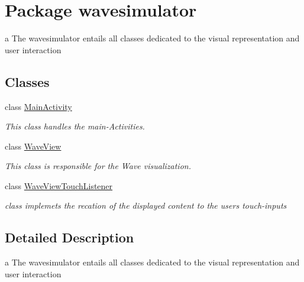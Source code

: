 \hypertarget{namespacewavesimulator}{}\section{Package wavesimulator}
\label{namespacewavesimulator}


a The wavesimulator entails all classes dedicated to the visual representation and user interaction  


\subsection*{Classes}
\begin{DoxyCompactItemize}
\item 
class \hyperlink{classwavesimulator_1_1MainActivity}{Main\+Activity}
\begin{DoxyCompactList}\small\item\em This class handles the main-\/\+Activities. \end{DoxyCompactList}\item 
class \hyperlink{classwavesimulator_1_1WaveView}{Wave\+View}
\begin{DoxyCompactList}\small\item\em This class is responsible for the Wave visualization. \end{DoxyCompactList}\item 
class \hyperlink{classwavesimulator_1_1WaveViewTouchListener}{Wave\+View\+Touch\+Listener}
\begin{DoxyCompactList}\small\item\em class implemets the recation of the displayed content to the users touch-\/inputs \end{DoxyCompactList}\end{DoxyCompactItemize}


\subsection{Detailed Description}
a The wavesimulator entails all classes dedicated to the visual representation and user interaction 